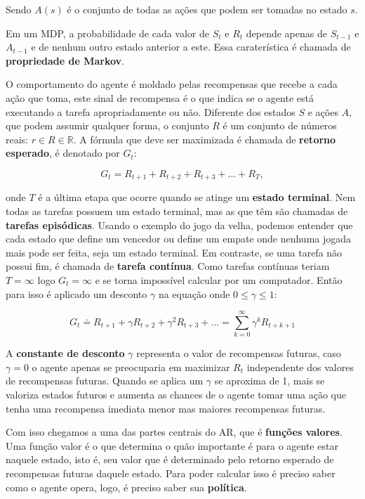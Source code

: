 Sendo $A(s)$ é o conjunto de todas as ações que podem ser tomadas no estado $s$.

Em um MDP, a probabilidade de cada valor de $S_t$ e $R_t$ depende apenas de $S_{t-1}$ e $A_{t-1}$ e de nenhum outro estado anterior a este. Essa caraterística  é chamada de \textbf{propriedade de Markov}. 

O comportamento do agente é moldado pelas recompensas que recebe a cada ação que toma, este sinal de recompensa é o que indica se o agente está executando a tarefa apropriadamente ou não. Diferente dos estados $S$ e ações $A$, que podem assumir qualquer forma, o conjunto $R$ é um conjunto de números reais: $r \in R \in \mathbb{R}$. A fórmula que deve ser maximizada é chamada de \textbf{retorno esperado}, é denotado por $G_t$:

\begin{equation} \label{expected-return}
   G_t = R_{t+1} + R_{t+2} + R_{t+3} + ... + R_{T},
\end{equation}

onde $T$ é a última etapa que ocorre quando se atinge um \textbf{estado terminal}. Nem todas as tarefas possuem um estado terminal, mas as que têm são chamadas de \textbf{tarefas episódicas}. Usando o exemplo do jogo da velha, podemos entender que cada estado que define um vencedor ou define um empate onde nenhuma jogada mais pode ser feita, seja um estado terminal. Em contraste, se uma tarefa não possui fim, é chamada de \textbf{tarefa contínua}. Como tarefas contínuas teriam $T = \infty$ logo $G_t = \infty$ e se torna impossível calcular por um computador. Então para isso é aplicado um desconto $\gamma$ na equação onde $0 \leqslant \gamma \leqslant 1$:

\begin{equation}
   G_t \doteq R_{t+1} + \gamma R_{t+2} + \gamma^{2} R_{t+3} + ... = \sum_{k = 0}^{\infty}\gamma^{k}R_{t+k+1}
\end{equation}

A \textbf{constante de desconto} $\gamma$ representa o valor de recompensas futuras, caso $\gamma = 0$ o agente apenas se preocuparia em maximizar $R_t$ independente dos valores de recompensas futuras. Quando se aplica um $\gamma$ se aproxima de 1, mais se valoriza estados futuros e aumenta as chances de o agente tomar uma ação que tenha uma recompensa imediata menor mas maiores recompensas futuras. 

Com isso chegamos a uma das partes centrais do AR, que é \textbf{funções valores}. Uma função valor é o que determina o quão importante é para o agente estar naquele estado, isto é, seu valor que é determinado pelo retorno esperado de recompensas futuras daquele estado. Para poder calcular isso é preciso saber como o agente opera, logo, é preciso saber sua \textbf{política}.

